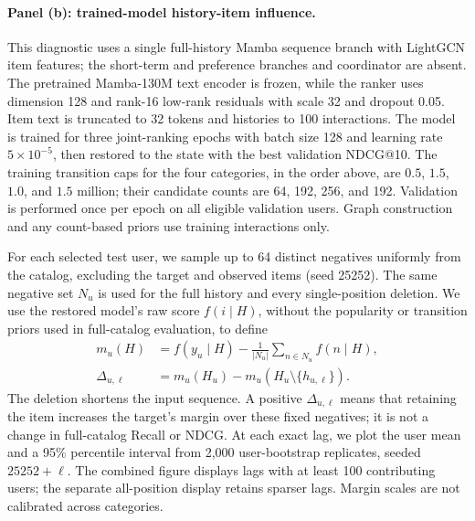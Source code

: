 \documentclass[11pt]{article}
\begin{document}
\paragraph{Panel (b): trained-model history-item influence.}
This diagnostic uses a single full-history Mamba sequence branch with LightGCN item features; the short-term and preference branches and coordinator are absent. The pretrained Mamba-130M text encoder is frozen, while the ranker uses dimension 128 and rank-16 low-rank residuals with scale 32 and dropout 0.05. Item text is truncated to 32 tokens and histories to 100 interactions. The model is trained for three joint-ranking epochs with batch size 128 and learning rate $5\times10^{-5}$, then restored to the state with the best validation NDCG@10. The training transition caps for the four categories, in the order above, are $0.5$, $1.5$, $1.0$, and $1.5$ million; their candidate counts are 64, 192, 256, and 192. Validation is performed once per epoch on all eligible validation users. Graph construction and any count-based priors use training interactions only.

For each selected test user, we sample up to 64 distinct negatives uniformly from the catalog, excluding the target and observed items (seed 25252). The same negative set $N_u$ is used for the full history and every single-position deletion. We use the restored model's raw score $f(i\mid H)$, without the popularity or transition priors used in full-catalog evaluation, to define
\begin{align}
 m_u(H)&=f(y_u\mid H)-\frac{1}{|N_u|}\sum_{n\in N_u}f(n\mid H),\\
 \Delta_{u,\ell}&=m_u(H_u)-m_u(H_u\setminus\{h_{u,\ell}\}).
 \label{eq:prelim_influence}
\end{align}
The deletion shortens the input sequence. A positive $\Delta_{u,\ell}$ means that retaining the item increases the target's margin over these fixed negatives; it is not a change in full-catalog Recall or NDCG. At each exact lag, we plot the user mean and a 95\% percentile interval from 2,000 user-bootstrap replicates, seeded $25252+\ell$. The combined figure displays lags with at least 100 contributing users; the separate all-position display retains sparser lags. Margin scales are not calibrated across categories.
\end{document}
